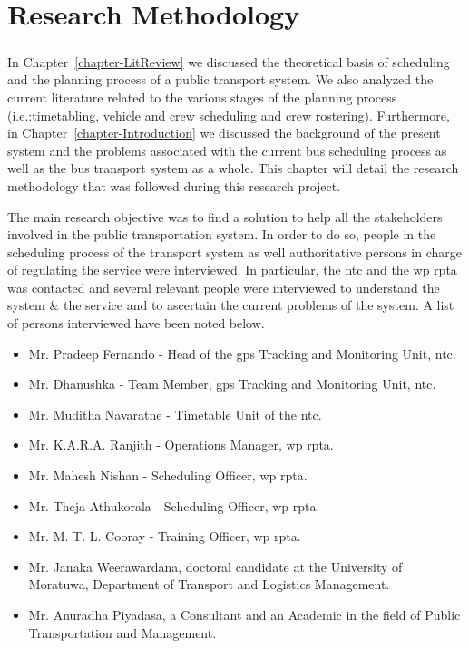 
\chapter{Research Methodology}
\label{chapter-ResearchMethodology}

\paragraph{ } In Chapter~\ref{chapter-LitReview} we discussed the theoretical basis of scheduling and the planning process of a public transport system. We also analyzed the current literature related to the various stages of the planning process (i.e.:timetabling, vehicle and crew scheduling and crew rostering). Furthermore, in Chapter~\ref{chapter-Introduction} we discussed the background of the present system and the problems associated with the current bus scheduling process as well as the bus transport system as a whole. This chapter will detail the research methodology that was followed during this research project.

The main research objective was to find a solution to help all the stakeholders involved in the public transportation system. In order to do so, people in the scheduling process of the transport system as well authoritative persons in charge of regulating the service were interviewed. In particular, the \acrshort{ntc} and the \acrshort{wp} \acrshort{rpta} was contacted and several relevant people were interviewed to understand the system \& the service and to ascertain the current problems of the system. A list of persons interviewed have been noted below.

\begin{itemize}
\item Mr. Pradeep Fernando - Head of the \acrshort{gps} Tracking and Monitoring Unit, \acrshort{ntc}.
\item Mr. Dhanushka - Team Member, \acrshort{gps} Tracking and Monitoring Unit, \acrshort{ntc}.
\item Mr. Muditha Navaratne - Timetable Unit of the \acrshort{ntc}.
\item Mr. K.A.R.A. Ranjith - Operations Manager, \acrshort{wp} \acrshort{rpta}.
\item Mr. Mahesh Nishan - Scheduling Officer, \acrshort{wp} \acrshort{rpta}.
\item Mr. Theja Athukorala - Scheduling Officer, \acrshort{wp} \acrshort{rpta}.
\item Mr. M. T. L. Cooray - Training Officer, \acrshort{wp} \acrshort{rpta}.
\item Mr. Janaka Weerawardana, doctoral candidate at the University of Moratuwa, Department of Transport and Logistics Management.
\item Mr. Anuradha Piyadasa, a Consultant and an Academic in the field of Public Transportation and Management.
\end{itemize}

